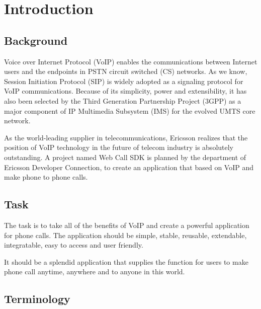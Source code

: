\chapter{Introduction}
\label{sec:Introduction}


\section{Background}
\label{sec:Introduction:Background}

Voice over Internet Protocol (VoIP)\label{sym:VoIP} enables the communications between Internet users and the endpoints in PSTN circuit switched (CS)\label{sym:CS} networks. As we know, Session Initiation Protocol (SIP) is widely adopted as a signaling protocol for VoIP communications. Because of its simplicity, power and extensibility, it has also been selected by the Third Generation Partnership Project (3GPP)\label{sym:3GPP} as a major component of IP Multimedia Subsystem (IMS)\label{sym:IMS} for the evolved UMTS core network. 

As the world-leading supplier in telecommunications, Ericsson realizes that the position of VoIP technology in the future of telecom industry is absolutely outstanding. A project named Web Call SDK is planned by the department of Ericsson Developer Connection, to create an application that based on VoIP and make phone to phone calls. 

\section{Task}
\label{sec:Introduction:Task}

The task is to take all of the benefits of VoIP and create a powerful application for phone calls. The application should be simple, stable, reusable, extendable, integratable, easy to access and user friendly. 

It should be a splendid application that supplies the function for users to make phone call anytime, anywhere and to anyone in this world.

\section{Terminology}
\label{sec:Terminology}


